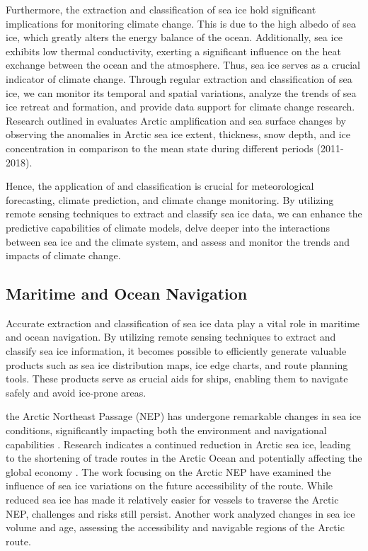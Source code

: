 Furthermore, the extraction and classification of sea ice hold significant implications for monitoring climate change. This is due to the high albedo \cite{179jakel2019validation} of sea ice, which greatly alters the energy balance of the ocean. Additionally, sea ice exhibits low thermal conductivity, exerting a significant influence on the heat exchange between the ocean and the atmosphere. Thus, sea ice serves as a crucial indicator of climate change. Through regular extraction and classification of sea ice, we can monitor its temporal and spatial variations, analyze the trends of sea ice retreat and formation, and provide data support for climate change research. Research outlined in  \cite{163chen2019assessments} evaluates Arctic amplification and sea surface changes by observing the anomalies in Arctic sea ice extent, thickness, snow depth, and ice concentration in comparison to the mean state during different periods (2011-2018).

Hence, the application of  and classification is crucial for meteorological forecasting, climate prediction, and climate change monitoring. By utilizing remote sensing techniques to extract and classify sea ice data, we can enhance the predictive capabilities of climate models, delve deeper into the interactions between sea ice and the climate system, and assess and monitor the trends and impacts of climate change.

\subsection{Maritime and Ocean Navigation}

Accurate extraction and classification of sea ice data play a vital role in maritime and ocean navigation. By utilizing remote sensing techniques to extract and classify sea ice information, it becomes possible to efficiently generate valuable products such as sea ice distribution maps, ice edge charts, and route planning tools. These products serve as crucial aids for ships, enabling them to navigate safely and avoid ice-prone areas.

the Arctic Northeast Passage (NEP) has undergone remarkable changes in sea ice conditions, significantly impacting both the environment and navigational capabilities \cite{171lei2015changes}. Research indicates a continued reduction in Arctic sea ice, leading to the shortening of trade routes in the Arctic Ocean and potentially affecting the global economy \cite{164melia2016sea}. The work \cite{165chen2020changes} focusing on the Arctic NEP have examined the influence of sea ice variations on the future accessibility of the route. While reduced sea ice has made it relatively easier for vessels to traverse the Arctic NEP, challenges and risks still persist. Another work \cite{166chen2021perspectives} analyzed changes in sea ice volume and age, assessing the accessibility and navigable regions of the Arctic route.


